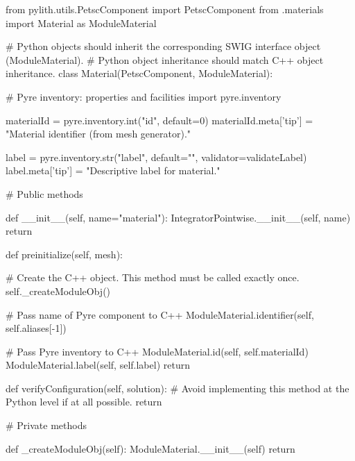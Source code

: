 \begin{python}
from pylith.utils.PetscComponent import PetscComponent
from .materials import Material as ModuleMaterial

# Python objects should inherit the corresponding SWIG interface object (ModuleMaterial).
# Python object inheritance should match C++ object inheritance.
class Material(PetscComponent, ModuleMaterial):

    # Pyre inventory: properties and facilities
    import pyre.inventory

    materialId = pyre.inventory.int("id", default=0)
    materialId.meta['tip'] = "Material identifier (from mesh generator)."

    label = pyre.inventory.str("label", default="", validator=validateLabel)
    label.meta['tip'] = "Descriptive label for material."


    # Public methods

    def __init__(self, name="material"):
        IntegratorPointwise.__init__(self, name)
        return

    def preinitialize(self, mesh):

        # Create the C++ object. This method must be called exactly once.
        self._createModuleObj()

        # Pass name of Pyre component to C++
        ModuleMaterial.identifier(self, self.aliases[-1])

        # Pass Pyre inventory to C++
        ModuleMaterial.id(self, self.materialId)
        ModuleMaterial.label(self, self.label)
        return

    def verifyConfiguration(self, solution):
        # Avoid implementing this method at the Python level if at all possible.
        return


    # Private methods

    def _createModuleObj(self):
        ModuleMaterial.__init__(self)
        return

\end{python}

